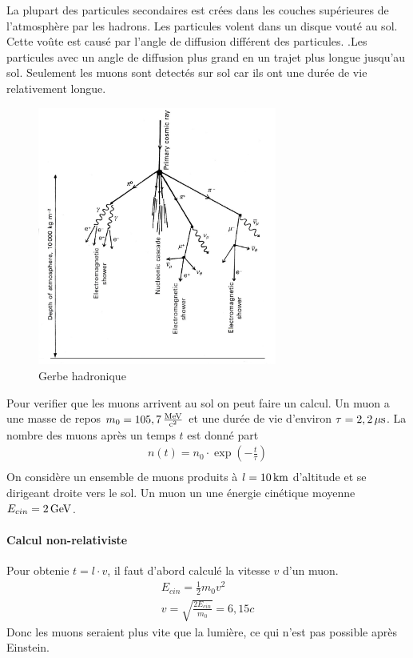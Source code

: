 \documentclass[a4paper,11pt,liststotocnumbered,bibtotocnumbered]{scrartcl}
\begin{document}
   La plupart des particules secondaires est crées dans les couches supérieures de l'atmosphère par les hadrons. Les particules volent dans un disque vouté au sol. Cette voûte est causé par l'angle de diffusion différent des particules. .Les particules avec un angle de diffusion plus grand en un trajet plus longue jusqu'au sol. Seulement les muons sont detectés sur sol car ils ont une durée de vie relativement longue. 
   \begin{figure}[H]
    \center
     \includegraphics[width=0.7\textwidth]{bilder/hadronischer_schauer.jpg}
     \caption{Gerbe hadronique}
   \end{figure}
    
   Pour verifier que les muons arrivent au sol on peut faire un calcul. Un muon a une masse de repos $m_0=\unit[105,7]{\frac{MeV}{c^2}}$ et une durée de vie d'environ $\tau=\unit[2,2]{\mu s}$. La nombre des muons après un temps $t$ est donné part
   \begin{eqnarray*}
    n(t)=n_0\cdot\exp\left(-\frac{t}{\tau}\right)\\
   \end{eqnarray*}
   On considère un ensemble de muons produits à $l=\unit[10]{km}$ d'altitude et se dirigeant droite vers le sol. Un muon un une énergie cinétique moyenne $E_{cin}=\unit[2]{GeV}$.
   \paragraph{Calcul non-relativiste}
    Pour obtenie $t=l\cdot v$, il faut d'abord calculé la vitesse $v$ d'un muon.
    \begin{eqnarray*}
     E_{cin}=\frac{1}{2}m_0v^2\\
     v=\sqrt{\frac{2E_{cin}}{m_0}}=6,15c
    \end{eqnarray*}
    Donc les muons seraient plus vite que la lumière, ce qui n'est pas possible après Einstein.
\end{document}
